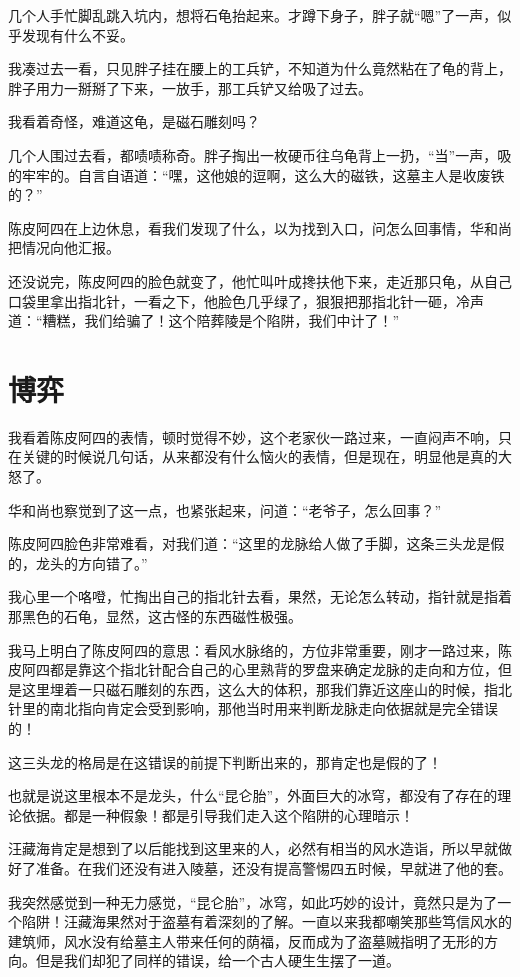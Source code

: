 几个人手忙脚乱跳入坑内，想将石龟抬起来。才蹲下身子，胖子就“嗯”了一声，似乎发现有什么不妥。

我凑过去一看，只见胖子挂在腰上的工兵铲，不知道为什么竟然粘在了龟的背上，胖子用力一掰掰了下来，一放手，那工兵铲又给吸了过去。

我看着奇怪，难道这龟，是磁石雕刻吗？

几个人围过去看，都啧啧称奇。胖子掏出一枚硬币往乌龟背上一扔，“当”一声，吸的牢牢的。自言自语道：“嘿，这他娘的逗啊，这么大的磁铁，这墓主人是收废铁的？”

陈皮阿四在上边休息，看我们发现了什么，以为找到入口，问怎么回事情，华和尚把情况向他汇报。

还没说完，陈皮阿四的脸色就变了，他忙叫叶成搀扶他下来，走近那只龟，从自己口袋里拿出指北针，一看之下，他脸色几乎绿了，狠狠把那指北针一砸，冷声道：“糟糕，我们给骗了！这个陪葬陵是个陷阱，我们中计了！”

\chapter{博弈}

我看着陈皮阿四的表情，顿时觉得不妙，这个老家伙一路过来，一直闷声不响，只在关键的时候说几句话，从来都没有什么恼火的表情，但是现在，明显他是真的大怒了。

华和尚也察觉到了这一点，也紧张起来，问道：“老爷子，怎么回事？”

陈皮阿四脸色非常难看，对我们道：“这里的龙脉给人做了手脚，这条三头龙是假的，龙头的方向错了。”

我心里一个咯噔，忙掏出自己的指北针去看，果然，无论怎么转动，指针就是指着那黑色的石龟，显然，这古怪的东西磁性极强。

我马上明白了陈皮阿四的意思：看风水脉络的，方位非常重要，刚才一路过来，陈皮阿四都是靠这个指北针配合自己的心里熟背的罗盘来确定龙脉的走向和方位，但是这里埋着一只磁石雕刻的东西，这么大的体积，那我们靠近这座山的时候，指北针里的南北指向肯定会受到影响，那他当时用来判断龙脉走向依据就是完全错误的！

这三头龙的格局是在这错误的前提下判断出来的，那肯定也是假的了！

也就是说这里根本不是龙头，什么“昆仑胎”，外面巨大的冰穹，都没有了存在的理论依据。都是一种假象！都是引导我们走入这个陷阱的心理暗示！

汪藏海肯定是想到了以后能找到这里来的人，必然有相当的风水造诣，所以早就做好了准备。在我们还没有进入陵墓，还没有提高警惕四五时候，早就进了他的套。

我突然感觉到一种无力感觉，“昆仑胎”，冰穹，如此巧妙的设计，竟然只是为了一个陷阱！汪藏海果然对于盗墓有着深刻的了解。一直以来我都嘲笑那些笃信风水的建筑师，风水没有给墓主人带来任何的荫福，反而成为了盗墓贼指明了无形的方向。但是我们却犯了同样的错误，给一个古人硬生生摆了一道。

